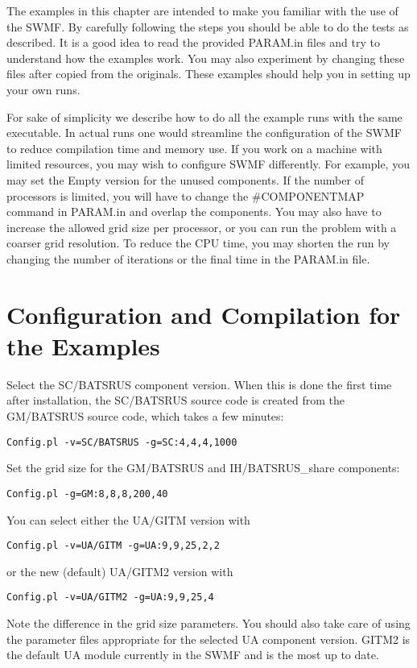 The examples in this chapter are intended to make you familiar
with the use of the SWMF. By carefully following the steps you should
be able to do the tests as described. It is a good idea to read the
provided PARAM.in files and try to understand how
the examples work. You may also experiment by changing these files
after copied from the originals. These examples should help you
in setting up your own runs.

For sake of simplicity we describe how to do all the example runs with the
same executable. In actual runs one would streamline the configuration
of the SWMF to reduce compilation time and memory use. If you work
on a machine with limited resources, you may wish to configure SWMF
differently. For example, you may set the Empty version for the unused
components. If the number of processors is limited, you will have to
change the \#COMPONENTMAP command in PARAM.in and overlap the components. You may also have to 
increase the allowed grid size per processor, or you can run the problem with 
a coarser grid resolution. To reduce the CPU time, you may shorten the 
run by changing the number of iterations or the final time in the 
PARAM.in file.

\section{Configuration and Compilation for the Examples}

Select the SC/BATSRUS component version. When this is done the first time
after installation, the SC/BATSRUS source code is created from the GM/BATSRUS
source code, which takes a few minutes:
\begin{verbatim}
Config.pl -v=SC/BATSRUS -g=SC:4,4,4,1000
\end{verbatim}
Set the grid size for the GM/BATSRUS and IH/BATSRUS\_share components:
\begin{verbatim}
Config.pl -g=GM:8,8,8,200,40
\end{verbatim}
You can select either the UA/GITM version with
\begin{verbatim}
Config.pl -v=UA/GITM -g=UA:9,9,25,2,2
\end{verbatim}
or the new (default) UA/GITM2 version with
\begin{verbatim}
Config.pl -v=UA/GITM2 -g=UA:9,9,25,4
\end{verbatim}
Note the difference in the grid size parameters.
You should also take care of using the parameter files appropriate for
the selected UA component version.  GITM2 is the default UA module
currently in the SWMF and is the most up to date.


